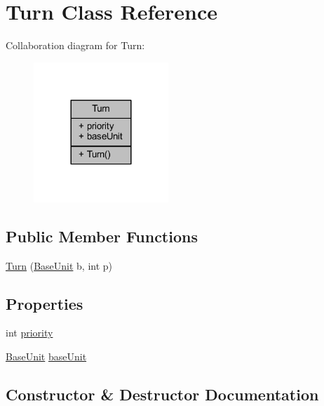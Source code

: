 \hypertarget{class_turn}{}\section{Turn Class Reference}
\label{class_turn}


Collaboration diagram for Turn\+:
\nopagebreak
\begin{figure}[H]
\begin{center}
\leavevmode
\includegraphics[width=144pt]{class_turn__coll__graph}
\end{center}
\end{figure}
\subsection*{Public Member Functions}
\begin{DoxyCompactItemize}
\item 
\mbox{\hyperlink{class_turn_a6446f2b617305c390dce97e1c7242066}{Turn}} (\mbox{\hyperlink{class_base_unit}{Base\+Unit}} b, int p)
\end{DoxyCompactItemize}
\subsection*{Properties}
\begin{DoxyCompactItemize}
\item 
int \mbox{\hyperlink{class_turn_aad40e669aa7299a23aa01c1756edd975}{priority}}
\item 
\mbox{\hyperlink{class_base_unit}{Base\+Unit}} \mbox{\hyperlink{class_turn_a59d549b1393677617e4237dcab3e27f9}{base\+Unit}}
\end{DoxyCompactItemize}


\subsection{Constructor \& Destructor Documentation}
\mbox{\label{class_turn_a6446f2b617305c390dce97e1c7242066}} 
